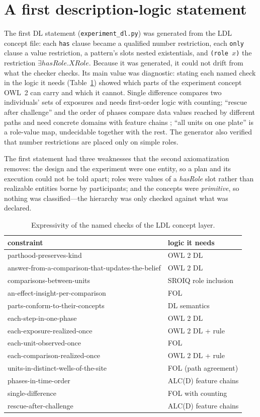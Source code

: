 \documentclass[10pt,a4paper]{article}
\begin{document}
\section{A first description-logic statement}\label{sec:dlv1}
The first DL statement (\texttt{experiment\_\allowbreak{}dl.py}) was generated from the LDL concept file: each \texttt{has}
clause became a qualified number restriction, each \texttt{only} clause a value restriction, a pattern's slots nested
existentials, and \texttt{(role $x$)} the restriction $\exists \mathit{hasRole}.X\mathit{Role}$. Because it was
generated, it could not drift from what the checker checks. Its main value was diagnostic: stating each named check
in the logic it needs (Table~\ref{tab:v1expr}) showed which parts of the experiment concept OWL~2 can carry and which
it cannot. Single difference compares two individuals' sets of exposures and needs first-order logic with counting;
``rescue after challenge'' and the order of phases compare data values reached by different paths and need concrete
domains with feature chains \citep{baader1991}; ``all units on one plate'' is a role-value map, undecidable together
with the rest. The generator also verified that number restrictions are placed only on simple roles.

The first statement had three weaknesses that the second axiomatization removes: the design and the experiment were
one entity, so a plan and its execution could not be told apart; roles were values of a \emph{hasRole} slot rather
than realizable entities borne by participants; and the concepts were \emph{primitive}, so nothing was classified---the
hierarchy was only checked against what was declared.

\begin{table}[tbp]\centering\footnotesize
\caption{Expressivity of the named checks of the LDL concept layer.}\label{tab:v1expr}
\begin{tabularx}{\linewidth}{@{}p{5.2cm}X@{}}\toprule constraint & logic it needs \\ \midrule
parthood-preserves-kind & OWL 2 DL \\
answer-from-a-comparison-that-updates-the-belief & OWL 2 DL \\
comparisons-between-units & SROIQ role inclusion \\
an-effect-insight-per-comparison & FOL \\
parts-conform-to-their-concepts & DL semantics \\
each-step-in-one-phase & OWL 2 DL \\
each-exposure-realized-once & OWL 2 DL + rule \\
each-unit-observed-once & FOL \\
each-comparison-realized-once & OWL 2 DL + rule \\
units-in-distinct-wells-of-the-site & FOL (path agreement) \\
phases-in-time-order & ALC(D) feature chains \\
single-difference & FOL with counting \\
rescue-after-challenge & ALC(D) feature chains \\
\bottomrule\end{tabularx}\end{table}
\end{document}
